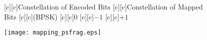 \documentclass{article}
\begin{document}
\begin{figure}[htb]
  \begin{center}


        [c][c]{Constellation of Encoded Bits}
        [c][c]{\hspace{5mm}Constellation of Mapped Bits}
        [c][c]{(BPSK)}
        [c][c]{$0$}
        [c][c]{$-1$}
        [c][c]{$+1$}

    \texttt{[image: mapping\_psfrag.eps]}
    \end{center}
\end{figure}
\end{document}
